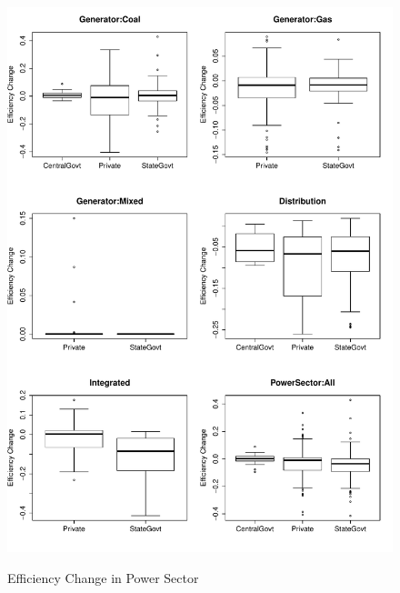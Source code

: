 \begin{figure}[h]
\centering
\caption{Efficiency Change in Power Sector}
	\label{fig:EffChange}
\includegraphics[width=1.00\textwidth]{chapter02/EffChange.pdf}\\		
\end{figure}

